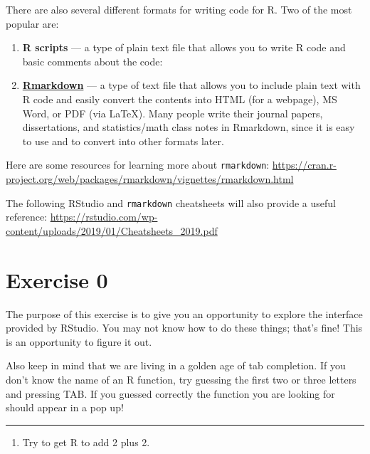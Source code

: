 \documentclass[]{book}
\providecommand{\tightlist}{%
  \setlength{\itemsep}{0pt}\setlength{\parskip}{0pt}}
\begin{document}
There are also several different formats for writing code for R. Two of
the most popular are:

\begin{enumerate}
\def\labelenumi{\arabic{enumi}.}
\item
  \textbf{R scripts} --- a type of plain text file that allows you to write R code
  and basic comments about the code:
\item
  \href{https://rmarkdown.rstudio.com/}{\textbf{Rmarkdown}} --- a type of text file that
  allows you to include plain text with R code and easily convert the contents
  into HTML (for a webpage), MS Word, or PDF (via LaTeX). Many people write
  their journal papers, dissertations, and statistics/math class notes in
  Rmarkdown, since it is easy to use and to convert into other formats later.
\end{enumerate}

Here are some resources for learning more about \texttt{rmarkdown}:
\url{https://cran.r-project.org/web/packages/rmarkdown/vignettes/rmarkdown.html}

The following RStudio and \texttt{rmarkdown} cheatsheets will also provide a
useful reference: \url{https://rstudio.com/wp-content/uploads/2019/01/Cheatsheets_2019.pdf}

\hypertarget{exercise-0}{%
\section{Exercise 0}\label{exercise-0}}

The purpose of this exercise is to give you an opportunity to explore
the interface provided by RStudio. You may not know how to do these things;
that's fine! This is an opportunity to figure it out.

Also keep in mind that we are living in a golden age of tab completion.
If you don't know the name of an R function, try guessing the first two
or three letters and pressing TAB. If you guessed correctly the function
you are looking for should appear in a pop up!

\begin{center}\rule{0.5\linewidth}{\linethickness}\end{center}

\begin{enumerate}
\def\labelenumi{\arabic{enumi}.}
\tightlist
\item
  Try to get R to add 2 plus 2.
\end{enumerate}
\end{document}
